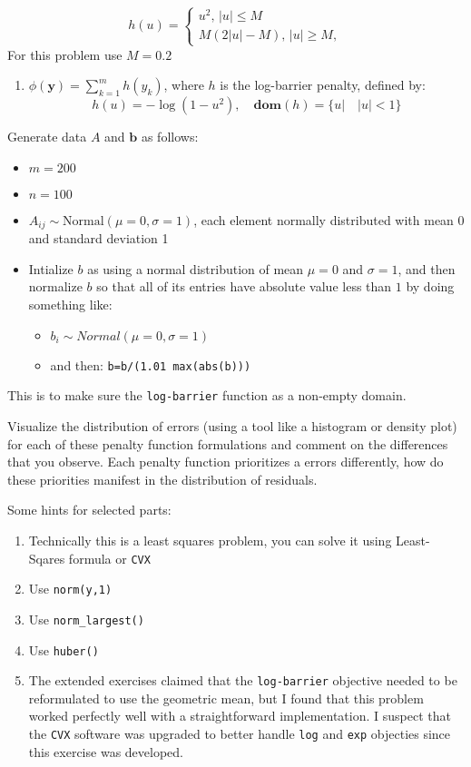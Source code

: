 \documentclass[
  letterpaper,
  DIV=11,
  numbers=noendperiod]{scrartcl}
\providecommand{\tightlist}{%
  \setlength{\itemsep}{0pt}\setlength{\parskip}{0pt}}\usepackage{longtable,booktabs,array}
\begin{document}
\[
h(u) = \begin{cases} u^2,\, |u|\leq M \\
 M(2|u|-M),\, |u|\geq M,
\end{cases}
\] For this problem use \(M=0.2\)

\begin{enumerate}
\def\labelenumi{(\alph{enumi})}
\setcounter{enumi}{4}
\tightlist
\item
  \(\phi(\mathbf{y}) = \sum_{k=1}^m h(y_k)\), where \(h\) is the
  log-barrier penalty, defined by: \[
  h(u) = -\log(1-u^2),\quad \mathbf{dom}(h) = \{u |\quad|u|< 1 \}
  \]
\end{enumerate}

Generate data \(A\) and \(\mathbf{b}\) as follows:

\begin{itemize}
\tightlist
\item
  \(m=200\)
\item
  \(n=100\)
\item
  \(A_{ij} \sim \mathrm{Normal}(\mu = 0,\sigma = 1)\), each element
  normally distributed with mean 0 and standard deviation 1
\item
  Intialize \(b\) as using a normal distribution of mean \(\mu=0\) and
  \(\sigma=1\), and then normalize \(b\) so that all of its entries have
  absolute value less than \(1\) by doing something like:

  \begin{itemize}
  \tightlist
  \item
    \(b_i \sim Normal(\mu = 0,\sigma = 1)\)
  \item
    and then: \texttt{b=b/(1.01\ max(abs(b)))}
  \end{itemize}
\end{itemize}

This is to make sure the \texttt{log-barrier} function as a non-empty
domain.

Visualize the distribution of errors (using a tool like a histogram or
density plot) for each of these penalty function formulations and
comment on the differences that you observe. Each penalty function
prioritizes a errors differently, how do these priorities manifest in
the distribution of residuals.

Some hints for selected parts:

\begin{enumerate}
\def\labelenumi{(\alph{enumi})}
\tightlist
\item
  Technically this is a least squares problem, you can solve it using
  Least-Sqares formula or \texttt{CVX}
\item
  Use \texttt{norm(y,1)}
\item
  Use \texttt{norm\_largest()}
\item
  Use \texttt{huber()}
\item
  The extended exercises claimed that the \texttt{log-barrier} objective
  needed to be reformulated to use the geometric mean, but I found that
  this problem worked perfectly well with a straightforward
  implementation. I suspect that the \texttt{CVX} software was upgraded
  to better handle \texttt{log} and \texttt{exp} objecties since this
  exercise was developed.
\end{enumerate}
\end{document}
